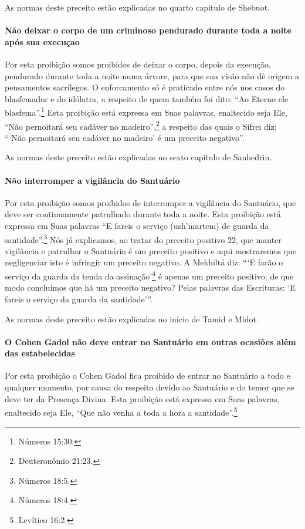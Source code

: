 As normas deste preceito estão explicadas no quarto capítulo de Shebuot.

\paragraph{Não deixar o corpo de um criminoso pendurado durante toda a
noite após sua execuçao}

Por esta proibição somos proibidos de deixar o corpo, depois da
execução, pendurado durante toda a noite numa árvore, para que sua visão
não dê origem a pensamentos sacrílegos. O enforcamento só é praticado
entre nós nos casos do blasfemador e do idólatra, a respeito de quem
também foi dito: ``Ao Eterno ele blasfema''.\footnote{Números 15:30.} Esta proibição está expressa em Suas palavras, enaltecido seja Ele, ``Não pernoitará seu cadáver no
madeiro'',\footnote{Deuteronômio 21:23.} a respeito das quais o Sifrei diz:
```Não pernoitará seu cadáver no madeiro' é um preceito negativo''.

As normas deste preceito estão explicadas no sexto capítulo de Sanhedrin.

\paragraph{Não interromper a vigilância do Santuário}

Por esta proibição somos proibidos de interromper a vigilância do
Santuário, que deve ser continuamente patrulhado durante toda a noite.
Esta proibição está expressa em Suas palavras ``E fareis o serviço
(ush'martem) de guarda da santidade''.\footnote{Números 18:5.} Nós já explicamos,
ao tratar do preceito positivo 22, que manter vigilância e patrulhar o
Santuário é um preceito positivo e aqui mostraremos que negligenciar
isto é infringir um preceito negativo. A Mekhiltá diz: ```E farão o
serviço da guarda da tenda da assinação'\footnote{Números 18:4.} é apenas um
preceito positivo; de que modo concluímos que há um preceito negativo?
Pelas palavras das Escrituras: `E fareis o serviço da guarda da
santidade'''.

As normas deste preceito estão explicadas no início de Tamid e Midot.

\paragraph{O Cohen Gadol não deve entrar no Santuário em outras ocasiões além das estabelecidas}

Por esta proibição o Cohen Gadol fica proibido de entrar no
Santuário a todo e qualquer momento, por causa do respeito devido ao
Santuário e do temor que se deve ter da Presença Divina. Esta proibição
está expressa em Suas palavras, enaltecido seja Ele, ``Que não venha a
toda a hora a santidade''.\footnote{Levítico 16:2.}

